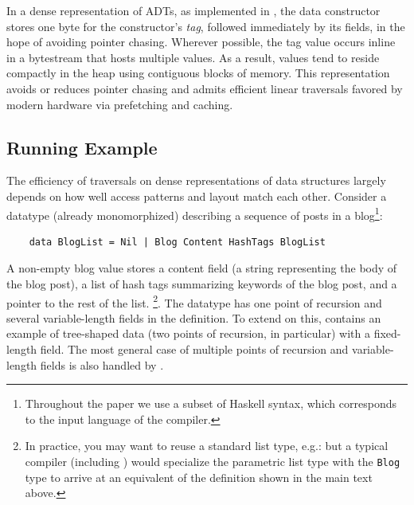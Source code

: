 In a dense representation of ADTs, as implemented in \gibbon{},
the data constructor stores
one byte for the constructor's {\em tag}, followed immediately by its fields,
in the hope of avoiding pointer chasing.
%
Wherever possible, the tag value occurs inline in a bytestream that
hosts multiple values.
%
As a result, values tend to reside compactly in the heap using contiguous blocks of
memory. This representation avoids or reduces pointer chasing and admits
efficient linear traversals favored by modern hardware via
prefetching and caching.


\subsection{Running Example}%
\label{sec:overview:example}

The efficiency of traversals on dense representations of data structures
largely depends on how well access patterns and layout match each other.
%
Consider a datatype (already monomorphized) describing
a sequence of posts in a blog\footnote{Throughout the paper we use a subset of Haskell syntax, which
corresponds to the input language of the \gibbon compiler.}:
\begin{lstlisting}
    data BlogList = Nil | Blog Content HashTags BlogList
\end{lstlisting}
%
A non-empty blog value stores a content field (a
string representing the body of the blog post), a list of hash tags
summarizing keywords of the blog post, and a pointer to the rest of
the list.%
%
\footnote{%
  In practice, you may want to reuse a standard list type, e.g.:
   but a typical compiler (including
  \gibbon) would specialize the parametric list type with the \lstinline|Blog|
  type to arrive at an equivalent of the definition shown in the main text
  above.%
}. The datatype has one point of recursion and several variable-length fields in
the definition. To extend on this,  contains
an example of tree-shaped data (two points of recursion, in particular) with a
fixed-length field. The most general case of multiple points of recursion and
variable-length fields is also handled by \system.

